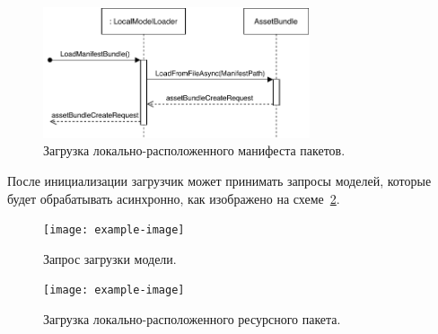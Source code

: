 \begin{figure}[!htp]
    \centering
    \includegraphics[width=0.7\textwidth]{images/UML-SLocalLoadManifestBundle.pdf}
    \caption{Загрузка локально-расположенного манифеста пакетов.}
    \label{figure:SLocalLoadManifestBundle}
\end{figure}

После инициализации загрузчик может принимать запросы моделей,
которые будет обрабатывать асинхронно, как изображено
на схеме~\ref{figure:SModelRequest}.

\begin{figure}[!htp]
    \centering
    \texttt{[image: example-image]}
    \caption{Запрос загрузки модели.}
    \label{figure:SModelRequest}
\end{figure}


\begin{figure}[!htp]
    \centering
    \texttt{[image: example-image]}
    \caption{Загрузка локально-расположенного ресурсного пакета.}
    \label{figure:SLocalLoadBundle}
\end{figure}
